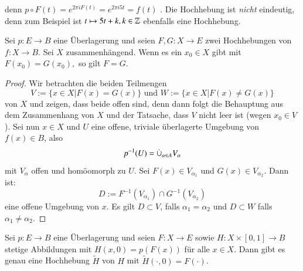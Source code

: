 \documentclass[a4paper,10pt]{scrartcl}
\begin{document}
\begin{figure}[H]
\centering
 
\caption{}
\end{figure}

denn $p\circ F(t)=e^{2\pi i F(t)}=e^{2\pi i 5 t}=f(t)$ . Die Hochhebung ist \emph{nicht} eindeutig, denn zum Beispiel ist
$t\mapsto 5t+k, k\in \mathbb{Z}$  ebenfalls eine Hochhebung.
\begin{st}\label{thm2:2.3}
Sei $p: E \to B$ eine Überlagerung und seien $F,G: X\to E$ zwei Hochhebungen von $f:X\to B$. Sei $X$ zusammenhängend. Wenn es ein $x_0 \in X$ gibt mit $F(x_0)=G(x_0),$ so gilt $F=G$. 
\end{st}
\begin{proof}
 Wir betrachten die beiden Teilmengen
\[
 V:=\{x\in X|F(x) = G(x)\} \text{ und } W:=\{x\in X|F(x)\neq G(x)\}
\]
von $X$ und zeigen, dass beide offen sind, denn dann folgt die Behauptung aus dem Zusammenhang von $X$ und der Tatsache, dass $V$ nicht leer ist (wegen $x_0\in V$). Sei nun $x\in X$ und $U$ eine offene, triviale überlagerte Umgebung von $f(x)\in B$, also
\[
 p^{-1}(U)=\mathbin{\dot{\cup}}_{\alpha\in A} V_\alpha
\]
mit $V_\alpha$ offen und homöomorph zu $U$. Sei $F(x)\in V_{\alpha_1}$ und $G(x)\in V_{\alpha_2}$. Dann ist:
\[
 D:=F^{-1}(V_{\alpha_1})\cap G^{-1}(V_{\alpha_2})
\]
eine offene Umgebung von $x$. Es gilt $D\subset V$, falls $\alpha_1=\alpha_2$ und $D\subset W$ falls $\alpha_1\neq \alpha_2$.
\end{proof}
\begin{st} \label{thm2:2.4}
 Sei $p: E\to B$ eine Überlagerung und seien $F: X \to E$ sowie $H: X\times [0,1] \to B$ stetige Abbildungen mit $H(x,0)=p(F(x))$ für alle $x\in X$. Dann gibt es genau eine Hochhebung $\tilde H$ von $H$ mit $\tilde H(\cdot, 0)=F(\cdot)$.
\end{st}
\end{document}
